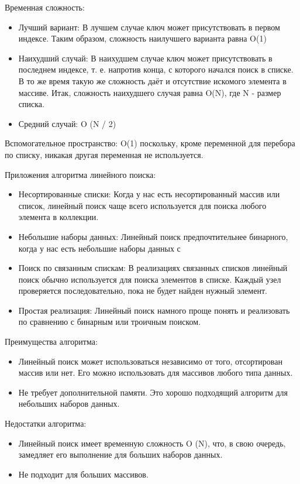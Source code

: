 Временная сложность:
\begin{itemize}
\item Лучший вариант: В лучшем случае ключ может присутствовать в первом индексе. Таким образом, сложность наилучшего варианта равна O(1)
\item Наихудший случай: В наихудшем случае ключ может присутствовать в последнем индексе, т. е. напротив конца, с которого начался поиск в списке. В то же время такую же сложность даёт и отсутствие искомого элемента в массиве. Итак, сложность наихудшего случая равна O(N), где N - размер списка.
\item Средний случай: O (N / 2)
\end{itemize}

Вспомогательное пространство: O(1) поскольку, кроме переменной для перебора по списку, никакая другая переменная не используется.

Приложения алгоритма линейного поиска:
\begin{itemize}
\item Несортированные списки: Когда у нас есть несортированный массив или список, линейный поиск чаще всего используется для поиска любого элемента в коллекции.
\item Небольшие наборы данных: Линейный поиск предпочтительнее бинарного, когда у нас есть небольшие наборы данных с
\item Поиск по связанным спискам: В реализациях связанных списков линейный поиск обычно используется для поиска элементов в списке. Каждый узел проверяется последовательно, пока не будет найден нужный элемент.
\item Простая реализация: Линейный поиск намного проще понять и реализовать по сравнению с бинарным или троичным поиском.
\end{itemize}

Преимущества алгоритма:
\begin{itemize}
\item Линейный поиск может использоваться независимо от того, отсортирован массив или нет. Его можно использовать для массивов любого типа данных.
\item Не требует дополнительной памяти.
Это хорошо подходящий алгоритм для небольших наборов данных.
\end{itemize}

Недостатки алгоритма:
\begin{itemize}
\item Линейный поиск имеет временную сложность O (N), что, в свою очередь, замедляет его выполнение для больших наборов данных.
\item Не подходит для больших массивов.
\end{itemize}

